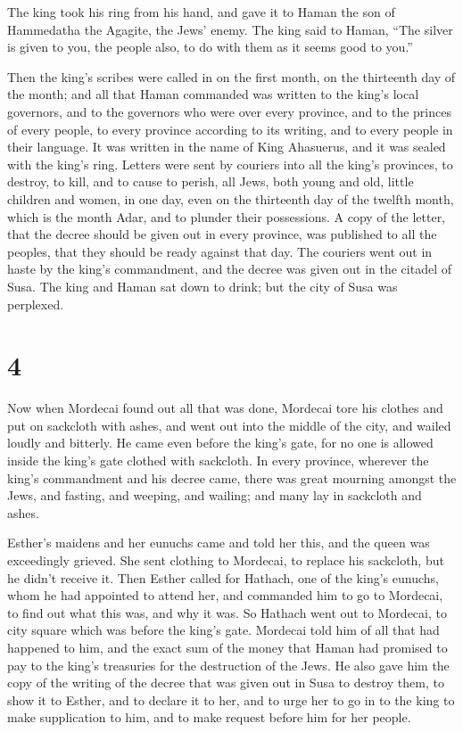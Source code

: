  The king took his ring from his hand, and gave it to
Haman the son of Hammedatha the Agagite, the Jews' enemy.
 The king said to Haman, ``The silver is given to you,
the people also, to do with them as it seems good to you.''

 Then the king's scribes were called in on the first
month, on the thirteenth day of the month; and all that Haman commanded
was written to the king's local governors, and to the governors who were
over every province, and to the princes of every people, to every
province according to its writing, and to every people in their
language. It was written in the name of King Ahasuerus, and it was
sealed with the king's ring.  Letters were sent by
couriers into all the king's provinces, to destroy, to kill, and to
cause to perish, all Jews, both young and old, little children and
women, in one day, even on the thirteenth day of the twelfth month,
which is the month Adar, and to plunder their possessions.
 A copy of the letter, that the decree should be given
out in every province, was published to all the peoples, that they
should be ready against that day.  The couriers went out
in haste by the king's commandment, and the decree was given out in the
citadel of Susa. The king and Haman sat down to drink; but the city of
Susa was perplexed.

\hypertarget{section-3}{%
\section{4}\label{section-3}}

 Now when Mordecai found out all that was done, Mordecai
tore his clothes and put on sackcloth with ashes, and went out into the
middle of the city, and wailed loudly and bitterly.  He
came even before the king's gate, for no one is allowed inside the
king's gate clothed with sackcloth.  In every province,
wherever the king's commandment and his decree came, there was great
mourning amongst the Jews, and fasting, and weeping, and wailing; and
many lay in sackcloth and ashes.

 Esther's maidens and her eunuchs came and told her this,
and the queen was exceedingly grieved. She sent clothing to Mordecai, to
replace his sackcloth, but he didn't receive it.  Then
Esther called for Hathach, one of the king's eunuchs, whom he had
appointed to attend her, and commanded him to go to Mordecai, to find
out what this was, and why it was.  So Hathach went out to
Mordecai, to city square which was before the king's gate.
 Mordecai told him of all that had happened to him, and
the exact sum of the money that Haman had promised to pay to the king's
treasuries for the destruction of the Jews.  He also gave
him the copy of the writing of the decree that was given out in Susa to
destroy them, to show it to Esther, and to declare it to her, and to
urge her to go in to the king to make supplication to him, and to make
request before him for her people.

